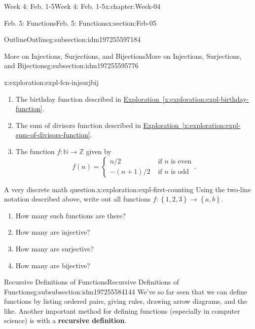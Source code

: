 \documentclass[oneside,10pt,]{book}
\newcommand{\xreffont}{\relax}
\newcommand{\terminology}[1]{\textbf{#1}}
\numberwithin{equation}{section}
\newcommand{\set}[1]{\left\{ {#1} \right\}}
\def\Z{{\mathbb Z}}
\def\N{{\mathbb N}}
\newcommand{\N}{\mathbb N}
\newcommand{\Z}{\mathbb Z}
\newcommand{\amp}{&}
\begin{document}
\begin{chapterptx}{Week 4: Feb. 1-5}{}{Week 4: Feb. 1-5}{}{}{x:chapter:Week-04}
\begin{sectionptx}{Feb. 5: Functions}{}{Feb. 5: Functions}{}{}{x:section:Feb-05}
\begin{subsectionptx}{Outline}{}{Outline}{}{}{g:subsection:idm197255597184}
\begin{subsectionptx}{More on Injections, Surjections, and Bijections}{}{More on Injections, Surjections, and Bijections}{}{}{g:subsection:idm197255595776}
\begin{exploration}{}{x:exploration:expl-fcn-injsurjbij}
\begin{enumerate}
\begin{equation*}
f = \begin{pmatrix}1 \amp 2 \amp 3 \amp 4 \amp 5 \\ 2 \amp 1 \amp 3 \amp 1\amp 4 \end{pmatrix},
\end{equation*}
where the number in the first row is understood to map to the number below it.%
\item{}The birthday function described in \hyperref[x:exploration:expl-birthday-function]{Exploration~{\xreffont\ref{x:exploration:expl-birthday-function}}}.%
\item{}The sum of divisors function described in \hyperref[x:exploration:expl-sum-of-divisors-function]{Exploration~{\xreffont\ref{x:exploration:expl-sum-of-divisors-function}}}.%
\item{}The function \(f : \N\to\Z\) given by%
\begin{equation*}
f(n) = \begin{cases} n/2 \amp \text{ if } n \text{ is even} \\ -(n+1)/2 \amp \text{ if } n \text{ is odd}\end{cases}.
\end{equation*}
%
\end{enumerate}
\end{exploration}%
\begin{exploration}{A very discrete math question.}{x:exploration:expl-first-counting}%
Using the two-line notation described above, write out all functions \(f: \set{1,2,3}\to \set{a,b}\).%
%
\begin{enumerate}
\item{}How many such functions are there?%
\item{}How many are injective?%
\item{}How many are surjective?%
\item{}How many are bijective?%
\end{enumerate}
\end{exploration}%
\end{subsectionptx}
%
%
\typeout{************************************************}
\typeout{************************************************}
%
\begin{subsubsectionptx}{Recursive Definitions of Functions}{}{Recursive Definitions of Functions}{}{}{g:subsubsection:idm197255584144}
We've so far seen that we can define functions by listing ordered pairs, giving rules, drawing arrow diagrams, and the like. Another important method for defining functions (especially in computer science) is with a \terminology{recursive definition}.%

\end{subsubsectionptx}
\end{subsectionptx}
\end{sectionptx}
\end{chapterptx}
\end{document}
